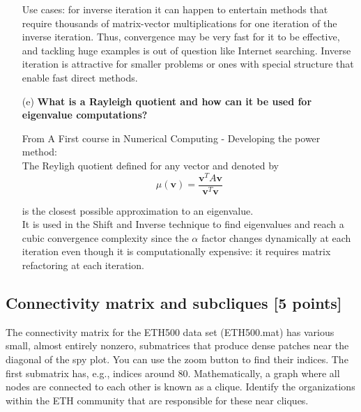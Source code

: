 \documentclass[unicode,11pt,a4paper,oneside,numbers=endperiod,openany]{scrartcl}
\begin{document}
\begin{enumerate}
        Use cases: for inverse iteration it can happen to entertain methods that require thousands of matrix-vector multiplications
        for one iteration of the inverse iteration.
        Thus, convergence may be very fast for it to be effective, and tackling huge examples is out of question
        like Internet searching.
        Inverse iteration is attractive for smaller problems or ones with special structure that enable fast direct methods.


    \item[(e)] \textbf{What is a Rayleigh quotient and how can it be used for eigenvalue computations?}

        From A First course in Numerical Computing - Developing the power method: \\
        The Reyligh quotient defined for any vector and denoted by \\

        \begin{equation} \label{rayleigh quotient}
            \mu(\textbf{v}) = \frac
            {\textbf{v}^T A\textbf{v}}
            {\textbf{v}^T \textbf{v}}
        \end{equation}

        is the closest possible approximation to an eigenvalue. \\
        It is used in the Shift and Inverse technique to find eigenvalues and reach a cubic convergence complexity
        since the $\alpha$ factor changes dynamically at each iteration even though it is computationally expensive:
        it requires matrix refactoring at each iteration.

\end{enumerate}
\cleardoublepage

\subsection{Connectivity matrix and subcliques [5 points]}
The connectivity matrix for the ETH500 data set (ETH500.mat) has various small, almost entirely nonzero, submatrices that produce dense patches near the diagonal of the spy plot.
You can use the zoom button to find their indices.
The first submatrix has, e.g., indices around 80. Mathematically, a graph where all nodes are connected to each other
is known as a clique. Identify the organizations within the ETH community that are responsible for these near cliques. \\
\end{document}
